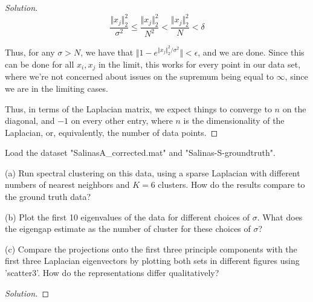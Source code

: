 \documentclass[10pt]{article}
\newenvironment{problem}[2][]{\begin{trivlist}
\item[\hskip \labelsep {\bfseries #1}\hskip \labelsep {\bfseries #2.}]}{\end{trivlist}}
\begin{document}
\begin{proof}[Solution]
$$ \frac{\Vert x_j \Vert_2^2}{\sigma^2}\leq  \frac{\Vert x_j \Vert_2^2}{N^2} <  \frac{\Vert x_j \Vert_2^2}{N} < \delta$$

Thus, for any $\sigma > N$, we have that $\Vert 1 - e^{\Vert x_j \Vert_2^2/\sigma^2} \Vert < \epsilon$, and we are done. Since this can be done for all $x_i, x_j$ in the limit, this works for every point in our data set, where we're not concerned about issues on the supremum being equal to $\infty$, since we are in the limiting cases.

Thus, in terms of the Laplacian matrix, we expect things to converge to $n$ on the diagonal, and $-1$ on every other entry, where $n$ is the dimensionality of the Laplacian, or, equivalently, the number of data points.



\end{proof}

\begin{problem}{Question 3}

Load the dataset "SalinasA\_corrected.mat" and "Salinas-S-groundtruth".

(a) Run spectral clustering on this data, using a sparse Laplacian with different numbers of nearest neighbors and $K = 6$ clusters. How do the results compare to the ground truth data?

(b) Plot the first 10 eigenvalues of the data for different choices of $\sigma$. What does the eigengap estimate as the number of cluster for these choices of $\sigma$?

(c) Compare the projections onto the first three principle components with the first three Laplacian eigenvectors by plotting both sets in different figures using 'scatter3'. How do the representations differ qualitatively?


\end{problem}

\begin{proof}[Solution]

\end{proof}
\end{document}
